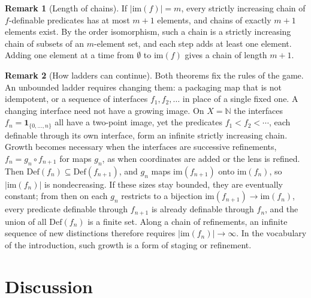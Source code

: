 \documentclass[11pt]{article}
\theoremstyle{definition}
\newtheorem{remark}{Remark}[section]
\newcommand{\Def}{\mathrm{Def}}
\newcommand{\im}{\mathrm{im}}
\newcommand{\1}{\mathbf{1}}
\begin{document}
\begin{remark}[Length of chains]\label{rem:chain_length}
If $|\im(f)|=m$, every strictly increasing chain of $f$-definable predicates has at most $m+1$ elements, and chains of exactly $m+1$ elements exist.
By the order isomorphism, such a chain is a strictly increasing chain of subsets of an $m$-element set, and each step adds at least one element.
Adding one element at a time from $\emptyset$ to $\im(f)$ gives a chain of length $m+1$.
\end{remark}

\begin{remark}[How ladders can continue]\label{rem:ladders_continue}
Both theorems fix the rules of the game.
An unbounded ladder requires changing them: a packaging map that is not idempotent, or a sequence of interfaces $f_1,f_2,\dots$ in place of a single fixed one.
A changing interface need not have a growing image.
On $X=\mathbb{N}$ the interfaces $f_n=\1_{\{0,\dots,n\}}$ all have a two-point image, yet the predicates $f_1<f_2<\cdots$, each definable through its own interface, form an infinite strictly increasing chain.
Growth becomes necessary when the interfaces are successive refinements, $f_n=g_n\circ f_{n+1}$ for maps $g_n$, as when coordinates are added or the lens is refined.
Then $\Def(f_n)\subseteq\Def(f_{n+1})$, and $g_n$ maps $\im(f_{n+1})$ onto $\im(f_n)$, so $|\im(f_n)|$ is nondecreasing.
If these sizes stay bounded, they are eventually constant; from then on each $g_n$ restricts to a bijection $\im(f_{n+1})\to\im(f_n)$, every predicate definable through $f_{n+1}$ is already definable through $f_n$, and the union of all $\Def(f_n)$ is a finite set.
Along a chain of refinements, an infinite sequence of new distinctions therefore requires $|\im(f_n)|\to\infty$.
In the vocabulary of the introduction, such growth is a form of staging or refinement.
\end{remark}
 \section{Discussion}\label{sec:discussion}
\end{document}
